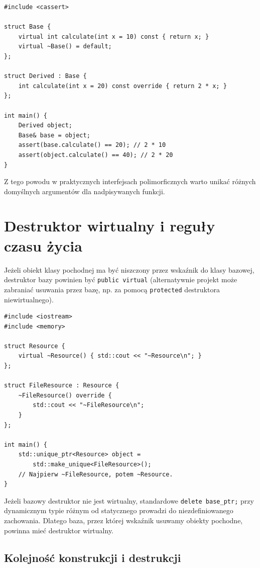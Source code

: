 \begin{lstlisting}[caption={Domyślny argument pochodzi z deklaracji bazy (C++11); kompletny program.}]
#include <cassert>

struct Base {
    virtual int calculate(int x = 10) const { return x; }
    virtual ~Base() = default;
};

struct Derived : Base {
    int calculate(int x = 20) const override { return 2 * x; }
};

int main() {
    Derived object;
    Base& base = object;
    assert(base.calculate() == 20); // 2 * 10
    assert(object.calculate() == 40); // 2 * 20
}
\end{lstlisting}

Z tego powodu w praktycznych interfejsach polimorficznych warto unikać
różnych domyślnych argumentów dla nadpisywanych funkcji.

\section{Destruktor wirtualny i reguły czasu życia}
\label{sec:cpp12-lifetime}

Jeżeli obiekt klasy pochodnej ma być niszczony przez wskaźnik do
klasy bazowej, destruktor bazy powinien być \texttt{public virtual}
(alternatywnie projekt może zabraniać usuwania przez bazę,
np. za pomocą \texttt{protected} destruktora niewirtualnego).

\begin{lstlisting}[caption={Bezpieczne usuwanie obiektu przez wskaźnik bazowy (C++14); kompletny program.}]
#include <iostream>
#include <memory>

struct Resource {
    virtual ~Resource() { std::cout << "~Resource\n"; }
};

struct FileResource : Resource {
    ~FileResource() override {
        std::cout << "~FileResource\n";
    }
};

int main() {
    std::unique_ptr<Resource> object =
        std::make_unique<FileResource>();
    // Najpierw ~FileResource, potem ~Resource.
}
\end{lstlisting}

Jeżeli bazowy destruktor nie jest wirtualny, standardowe
\texttt{delete base\_ptr;} przy dynamicznym typie różnym od statycznego
prowadzi do niezdefiniowanego zachowania. Dlatego baza, przez której
wskaźnik usuwamy obiekty pochodne, powinna mieć destruktor wirtualny.

\subsection{Kolejność konstrukcji i destrukcji}

